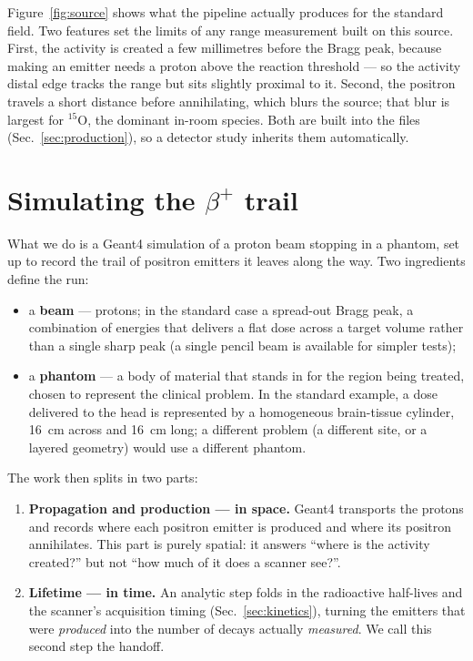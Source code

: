 \documentclass[11pt]{article}
\newcommand{\bplus}{\beta^{+}}
\newcommand{\Ox}[1]{{}^{#1}\mathrm{O}}
\begin{document}
Figure~\ref{fig:source} shows what the pipeline actually produces for the standard
field. Two features set the limits of any range measurement built on this source.
First, the activity is created a few millimetres before the Bragg peak,
because making an emitter needs a proton above the reaction threshold --- so the
activity distal edge tracks the range but sits slightly proximal to it. Second, the
positron travels a short distance before annihilating, which blurs the source; that
blur is largest for $\Ox{15}$, the dominant in-room species. Both are built into the
files (Sec.~\ref{sec:production}), so a detector study inherits them automatically.

\section{Simulating the \texorpdfstring{$\bplus$}{beta+} trail}
\label{sec:pipeline}

What we do is a Geant4 simulation of a proton beam stopping in a phantom, set up to
record the trail of positron emitters it leaves along the way. Two ingredients define
the run:
\begin{itemize}[nosep]
\item a \textbf{beam} --- protons; in the standard case a spread-out Bragg peak, a
combination of energies that delivers a flat dose across a target volume rather than a
single sharp peak (a single pencil beam is available for simpler tests);
\item a \textbf{phantom} --- a body of material that stands in for the region being
treated, chosen to represent the clinical problem. In the standard example, a dose
delivered to the head is represented by a homogeneous brain-tissue cylinder,
\SI{16}{cm} across and \SI{16}{cm} long; a different problem (a different site, or a
layered geometry) would use a different phantom.
\end{itemize}

The work then splits in two parts:
\begin{enumerate}[nosep]
\item \textbf{Propagation and production --- in space.} Geant4 transports the protons
and records where each positron emitter is produced and where its positron
annihilates. This part is purely spatial: it answers ``where is the activity created?''
but not ``how much of it does a scanner see?''.
\item \textbf{Lifetime --- in time.} An analytic step folds in the radioactive
half-lives and the scanner's acquisition timing (Sec.~\ref{sec:kinetics}), turning the
emitters that were \emph{produced} into the number of decays actually \emph{measured}.
We call this second step the handoff.
\end{enumerate}
\end{document}
